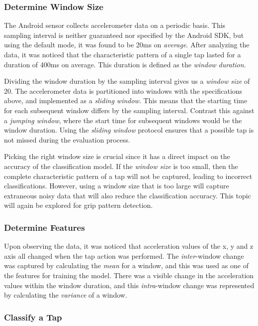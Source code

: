 \subsubsection{Determine Window Size}
The Android sensor collects accelerometer data on a periodic basis. This sampling interval is neither guaranteed nor specified by the Android SDK, but using the default mode, it was found to be 20ms on \textit{average}. After analyzing the data, it was noticed that the characteristic pattern of a single tap lasted for a duration of 400ms on average. This duration is defined as the \textit{window duration}.
\par
Dividing the window duration by the sampling interval gives us a \textit{window size} of 20. The accelerometer data is partitioned into windows with the specifications above, and implemented as a \textit{sliding window}. This means that the starting time for each subsequent window differs by the sampling interval. Contrast this against a \textit{jumping window}, where the start time for subsequent windows would be the window duration. Using the \textit{sliding window} protocol ensures that a possible tap is not missed during the evaluation process.
\par
Picking the right window size is crucial since it has a direct impact on the accuracy of the classification model. If the \textit{window size} is too small, then the complete characteristic pattern of a tap will not be captured, leading to incorrect classifications. However, using a window size that is too large will capture extraneous noisy data that will also reduce the classification accuracy. This topic will again be explored for grip pattern detection.

\subsubsection{Determine Features}
Upon observing the data, it was noticed that acceleration values of the x, y and z axis all changed when the tap action was performed. The \textit{inter}-window change was captured by calculating the \textit{mean} for a window, and this was used as one of the features for training the model. There was a visible change in the acceleration values within the window duration, and this \textit{intra}-window change was represented by calculating the \textit{variance} of a window. 

\subsubsection{Classify a Tap}


